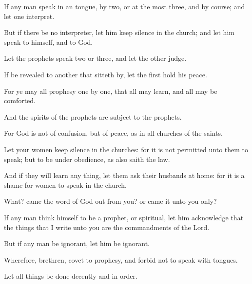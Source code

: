 {If any
man
speak
in
an
{}
tongue,
{}
by
two,
or at the
most
{}
three,
and
{} by
course;
and
let
one
interpret.

But
if there
be
no
interpreter, let him keep
silence
in the
church;
and let him
speak to
himself,
and to
God.

Let the
prophets
speak
two
or
three,
and
let the
other
judge.

If
{} be
revealed to
another that sitteth
by,
let the
first hold his
peace.

For ye
may
all
prophesy
one
by
one,
that
all may
learn,
and
all may be
comforted.

And the
spirits of the
prophets are
subject to the
prophets.

For
God
is
not
{} of
confusion,
but of
peace,
as
in
all
churches of the
saints.

Let
your
women keep
silence
in the
churches:
for it
is
not
permitted unto
them to
speak;
but
{} to be under
obedience,
as
also
saith the
law.

And
if they
will
learn any
thing, let them
ask
their
husbands
at
home:
for it
is a
shame for
women to
speak
in the
church.

What?
came the
word of
God
out
from
you?
or came
it
unto
you
only?

If any
man think
himself to
be a
prophet,
or
spiritual, let him
acknowledge that the
things
that I
write unto
you
are the
commandments of the
Lord.

But
if any
man be
ignorant, let him be
ignorant.

Wherefore,
brethren,
covet to
prophesy,
and
forbid
not to
speak with
tongues.

Let all
things be
done
decently
and
in
order.




\par }
